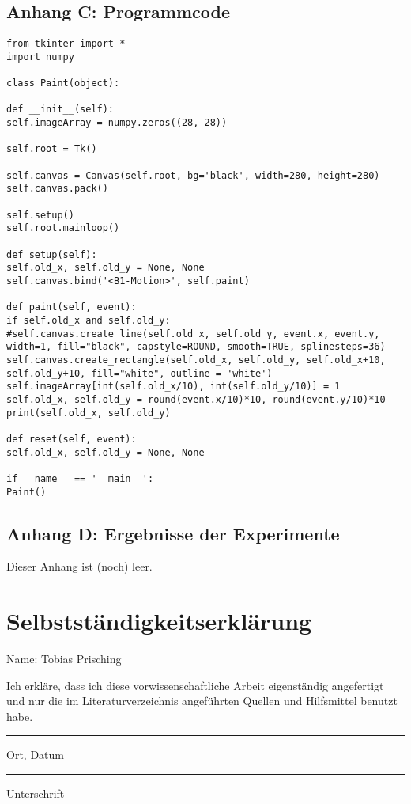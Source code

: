 \documentclass[a4paper,12pt,ngerman,oneside]{scrreprt}	%
\begin{document}
		\section*{Anhang C: Programmcode}
			{\renewcommand*\ttdefault{txtt} 
			\begin{lstlisting}[title=Beispielcode 1 (Beispiel nur zum Testen der Formatierung)]
from tkinter import *
import numpy

class Paint(object):

def __init__(self):
self.imageArray = numpy.zeros((28, 28))

self.root = Tk()

self.canvas = Canvas(self.root, bg='black', width=280, height=280)
self.canvas.pack()

self.setup()
self.root.mainloop()

def setup(self):
self.old_x, self.old_y = None, None
self.canvas.bind('<B1-Motion>', self.paint)

def paint(self, event):
if self.old_x and self.old_y:
#self.canvas.create_line(self.old_x, self.old_y, event.x, event.y, width=1, fill="black", capstyle=ROUND, smooth=TRUE, splinesteps=36)
self.canvas.create_rectangle(self.old_x, self.old_y, self.old_x+10, self.old_y+10, fill="white", outline = 'white')
self.imageArray[int(self.old_x/10), int(self.old_y/10)] = 1
self.old_x, self.old_y = round(event.x/10)*10, round(event.y/10)*10
print(self.old_x, self.old_y)

def reset(self, event):
self.old_x, self.old_y = None, None

if __name__ == '__main__':
Paint()	
			\end{lstlisting}}
		
		
		\newpage
		\vspace*{2cm}	
		\section*{Anhang D: Ergebnisse der Experimente}
			Dieser Anhang ist (noch) leer.

	
	
	\chapter*{Selbstständigkeitserklärung}
	Name: Tobias Prisching\newline
	
	Ich erkläre, dass ich diese vorwissenschaftliche Arbeit eigenständig angefertigt und nur die im Literaturverzeichnis angeführten Quellen und Hilfsmittel benutzt habe.
	
	\vspace{3cm}
	
	
	\parbox{6cm}{\centering\hrule
	\strut \centering\footnotesize Ort, Datum} \hfill\parbox{6cm}{\hrule
	\strut \centering\footnotesize Unterschrift}
	
	
\end{document}
